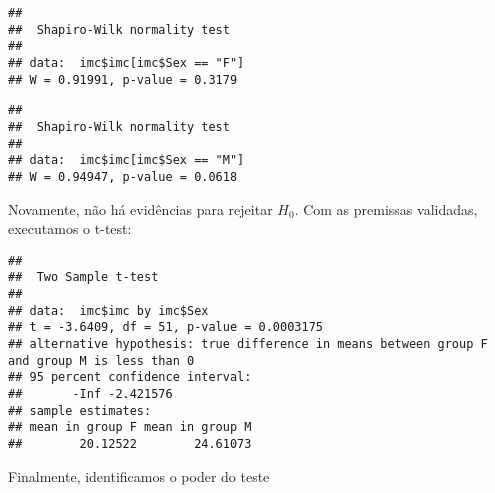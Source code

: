 \documentclass[
]{article}
\newenvironment{Shaded}{\begin{snugshade}}{\end{snugshade}}
\newcommand{\AttributeTok}[1]{\textcolor[rgb]{0.13,0.29,0.53}{#1}}
\newcommand{\CommentTok}[1]{\textcolor[rgb]{0.56,0.35,0.01}{\textit{#1}}}
\newcommand{\ConstantTok}[1]{\textcolor[rgb]{0.56,0.35,0.01}{#1}}
\newcommand{\DecValTok}[1]{\textcolor[rgb]{0.00,0.00,0.81}{#1}}
\newcommand{\FloatTok}[1]{\textcolor[rgb]{0.00,0.00,0.81}{#1}}
\newcommand{\FunctionTok}[1]{\textcolor[rgb]{0.13,0.29,0.53}{\textbf{#1}}}
\newcommand{\NormalTok}[1]{#1}
\newcommand{\SpecialCharTok}[1]{\textcolor[rgb]{0.81,0.36,0.00}{\textbf{#1}}}
\newcommand{\StringTok}[1]{\textcolor[rgb]{0.31,0.60,0.02}{#1}}
\begin{document}
\begin{verbatim}
## 
##  Shapiro-Wilk normality test
## 
## data:  imc$imc[imc$Sex == "F"]
## W = 0.91991, p-value = 0.3179
\end{verbatim}

\begin{Shaded}
\end{Shaded}

\begin{verbatim}
## 
##  Shapiro-Wilk normality test
## 
## data:  imc$imc[imc$Sex == "M"]
## W = 0.94947, p-value = 0.0618
\end{verbatim}

Novamente, não há evidências para rejeitar \(H_0\). Com as premissas
validadas, executamos o t-test:

\begin{Shaded}
\end{Shaded}

\begin{verbatim}
## 
##  Two Sample t-test
## 
## data:  imc$imc by imc$Sex
## t = -3.6409, df = 51, p-value = 0.0003175
## alternative hypothesis: true difference in means between group F and group M is less than 0
## 95 percent confidence interval:
##       -Inf -2.421576
## sample estimates:
## mean in group F mean in group M 
##        20.12522        24.61073
\end{verbatim}

Finalmente, identificamos o poder do teste

\begin{Shaded}
\end{Shaded}
\end{document}
